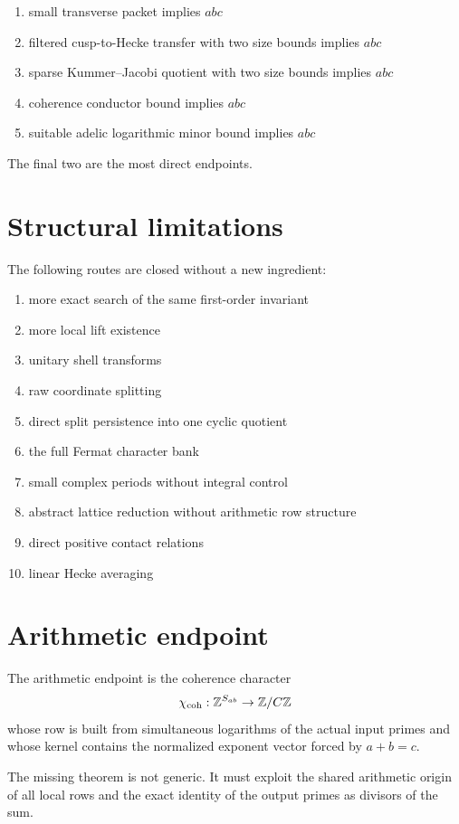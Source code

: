 \begin{enumerate}[leftmargin=1.5em]
\item small transverse packet implies $abc$
\item filtered cusp-to-Hecke transfer with two size bounds implies $abc$
\item sparse Kummer--Jacobi quotient with two size bounds implies $abc$
\item coherence conductor bound implies $abc$
\item suitable adelic logarithmic minor bound implies $abc$
\end{enumerate}

The final two are the most direct endpoints.

\section{Structural limitations}
The following routes are closed without a new ingredient:

\begin{enumerate}[leftmargin=1.5em]
\item more exact search of the same first-order invariant
\item more local lift existence
\item unitary shell transforms
\item raw coordinate splitting
\item direct split persistence into one cyclic quotient
\item the full Fermat character bank
\item small complex periods without integral control
\item abstract lattice reduction without arithmetic row structure
\item direct positive contact relations
\item linear Hecke averaging
\end{enumerate}

\section{Arithmetic endpoint}
The arithmetic endpoint is the coherence character
\[
 \chi_{\mathrm{coh}}:
 \mathbb Z^{S_{ab}}\to\mathbb Z/C\mathbb Z
\]
whose row is built from simultaneous logarithms of the actual input primes and whose kernel contains the normalized exponent vector forced by $a+b=c$.

The missing theorem is not generic. It must exploit the shared arithmetic origin of all local rows and the exact identity of the output primes as divisors of the sum.
